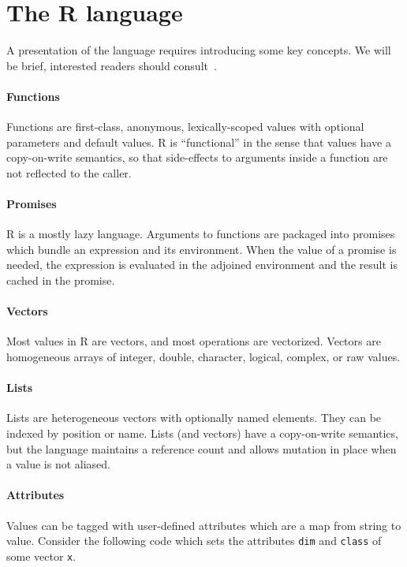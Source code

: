 \documentclass[10pt,review,sigplan,authorversion=true]{acmart}
\newcommand{\code}[1]{\lstinline |#1|\xspace}
\renewcommand{\c}[1]{\lstinline |#1|\xspace}
\begin{document}
\section{The R language}

A presentation of the language requires introducing some key concepts. We will
be brief, interested readers should consult~\cite{AdvancedR}.

\paragraph{Functions} Functions are first-class, anonymous, lexically-scoped values
with optional parameters and default values. R is ``functional'' in the sense
that values have a copy-on-write semantics, so that side-effects to arguments
inside a function are not reflected to the caller.

\paragraph{Promises} R is a mostly lazy language.  Arguments to functions are
packaged into promises which bundle an expression and its environment. When the
value of a promise is needed, the expression is evaluated in the adjoined
environment and the result is cached in the promise.

\paragraph{Vectors}  Most values in R are vectors, and most operations are
vectorized. Vectors are homogeneous arrays of integer, double,
character, logical, complex, or raw values.

\paragraph{Lists} Lists are heterogeneous vectors with optionally named elements.
They can be indexed by position or name. Lists (and vectors) have a
copy-on-write semantics, but the language maintains a reference count and allows
mutation in place when a value is not aliased.


\paragraph{Attributes}
Values can be tagged with user-defined attributes which are a map from string to
value. Consider the following code which sets the attributes \code{dim} and
\c{class} of some vector \code{x}.
\end{document}
